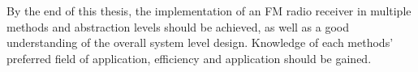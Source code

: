 By the end of this thesis, the implementation of an FM radio receiver in multiple methods and abstraction levels should be achieved, as well as a good understanding of the overall system level design.
Knowledge of each methods' preferred field of application, efficiency and application should be gained.


%
%
%
